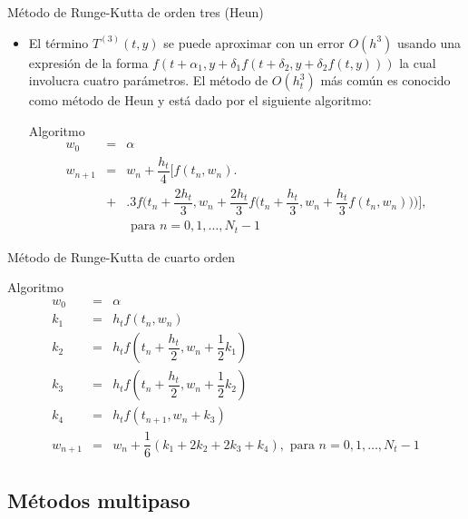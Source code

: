\documentclass{beamer}
\begin{document}
\begin{frame}{Método de Runge-Kutta de orden tres (Heun)}

{\small 
\begin{itemize}
	\item El término $T^{(3)}(t,y)$ se puede aproximar con un error $O(h^3)$ usando una expresión de la forma $f(t+\alpha_1, y + \delta_1 f (t + \delta_2, y + \delta_2 f(t,y)))$
	la cual involucra cuatro parámetros. El método de $O(h_t^3)$ más común es conocido como método de Heun y está dado por el siguiente algoritmo:
	
\begin{block}{Algoritmo}
	\begin{eqnarray*}
		w_0 & = & \alpha \\
		w_{n+1} & = & w_n + \dfrac{h_t}{4} \bigg[ f(t_n,w_n)  \Biggr. \nonumber\\ 
		&  + & \Biggl. 3f\Big(t_n+\dfrac{2h_t}{3},w_n+\dfrac{2h_t}{3} f\big(t_n+\dfrac{h_t}{3},w_n+\dfrac{h_t}{3} f(t_n,w_n)\big)\Big) \bigg], \\
		& & \text{ para } n = 0, 1, \dots, N_t-1 
	\end{eqnarray*}
\end{block}
\end{itemize}
}
\end{frame}

\begin{frame}{Método de Runge-Kutta de cuarto orden}

\begin{block}{Algoritmo}
	\begin{eqnarray*}
		w_0 & = & \alpha \\
		k_1 & = & h_t f(t_n, w_n) \\ 
		k_2 & = & h_t f\left(t_n + \dfrac{h_t}{2}, w_n + \dfrac{1}{2} k_1\right) \\ 
		k_3 & = & h_t f\left(t_n + \dfrac{h_t}{2}, w_n + \dfrac{1}{2} k_2\right) \\ 
		k_4 & = & h_t f\left(t_{n+1}, w_n + k_3\right) \\
		w_{n+1} & = & w_n + \dfrac{1}{6} (k_1 + 2k_2 + 2k_3 + k_4), \text{ para } n = 0, 1, \dots, N_t-1 
	\end{eqnarray*}
\end{block}

\end{frame}		
\subsection{Métodos multipaso}
\end{document}
